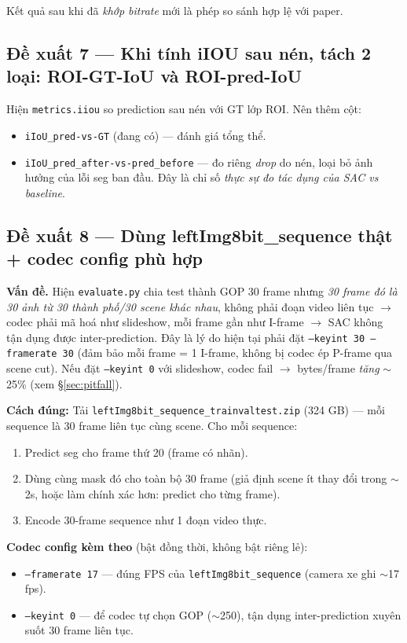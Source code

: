 \documentclass[12pt,a4paper]{article}
\begin{document}
Kết quả sau khi đã \emph{khớp bitrate} mới là phép so sánh hợp lệ với paper.

\subsection{Đề xuất 7 — Khi tính iIOU sau nén, tách 2 loại: ROI-GT-IoU và ROI-pred-IoU}

Hiện \texttt{metrics.iiou} so prediction sau nén với GT lớp ROI. Nên thêm cột:
\begin{itemize}[leftmargin=2em]
  \item \texttt{iIoU\_pred-vs-GT} (đang có) — đánh giá tổng thể.
  \item \texttt{iIoU\_pred\_after-vs-pred\_before} — đo riêng \emph{drop} do nén,
        loại bỏ ảnh hưởng của lỗi seg ban đầu. Đây là chỉ số \emph{thực sự đo tác
        dụng của SAC vs baseline}.
\end{itemize}

\subsection{Đề xuất 8 — Dùng leftImg8bit\_sequence thật + codec config phù hợp}

\textbf{Vấn đề.} Hiện \texttt{evaluate.py} chia test thành GOP 30 frame nhưng
\emph{30 frame đó là 30 ảnh từ 30 thành phố/30 scene khác nhau}, không phải đoạn
video liên tục $\to$ codec phải mã hoá như slideshow, mỗi frame gần như I-frame
$\to$ SAC không tận dụng được inter-prediction. Đây là lý do hiện tại phải đặt
\texttt{--keyint 30 --framerate 30} (đảm bảo mỗi frame = 1 I-frame, không bị
codec ép P-frame qua scene cut). Nếu đặt \texttt{--keyint 0} với slideshow, codec
fail $\to$ bytes/frame \emph{tăng} $\sim$25\% (xem \S\ref{sec:pitfall}).

\textbf{Cách đúng:} Tải \texttt{leftImg8bit\_sequence\_trainvaltest.zip} (324 GB)
— mỗi sequence là 30 frame liên tục cùng scene. Cho mỗi sequence:
\begin{enumerate}[leftmargin=2em]
  \item Predict seg cho frame thứ 20 (frame có nhãn).
  \item Dùng cùng mask đó cho toàn bộ 30 frame (giả định scene ít thay đổi trong
        $\sim$2s, hoặc làm chính xác hơn: predict cho từng frame).
  \item Encode 30-frame sequence như 1 đoạn video thực.
\end{enumerate}

\textbf{Codec config kèm theo} (bật đồng thời, không bật riêng lẻ):
\begin{itemize}[leftmargin=2em]
  \item \texttt{--framerate 17} — đúng FPS của \texttt{leftImg8bit\_sequence}
        (camera xe ghi $\sim$17 fps).
  \item \texttt{--keyint 0} — để codec tự chọn GOP ($\sim$250), tận dụng
        inter-prediction xuyên suốt 30 frame liên tục.
\end{itemize}
\end{document}
